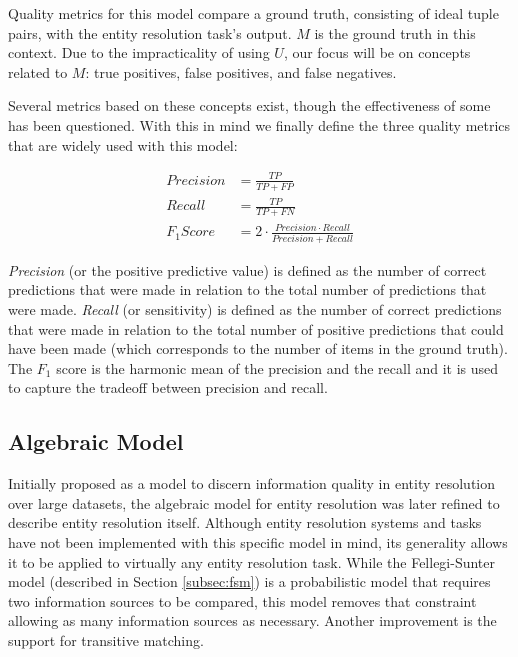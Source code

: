 \documentclass[11pt]{article}
\begin{document}
    Quality metrics for this model compare a ground truth, consisting of ideal
    tuple pairs, with the entity resolution task's output.
    $M$ is the ground truth in this context.
    Due to the impracticality of using $U$, our focus will be on concepts
    related to $M$: true positives, false positives, and false negatives.
    
    Several metrics based on these concepts exist, though the effectiveness of
    some has been questioned\cite{Goga2015}.
    With this in mind we finally define the three quality metrics that are
    widely used with this model:

    \begin{align}
    Precision&=\frac{TP}{TP+FP} \\
    Recall&=\frac{TP}{TP+FN} \\
    F_1 Score&=2 \cdot \frac{Precision \cdot Recall}{Precision+Recall}
    \end{align}

    \textit{Precision} (or the positive predictive value) is defined as the
    number of correct predictions that were made in relation to the total number
    of predictions that were made.
    \textit{Recall} (or sensitivity) is defined as the number of correct
    predictions that were made in relation to the total number of positive
    predictions that could have been made (which corresponds to the number of
    items in the ground truth).
    The \textit{$F_1$} score is the harmonic mean of the precision and the
    recall and it is used to capture the tradeoff between precision and
    recall\cite{hitesh2012}.

    \subsection[algebraic]{Algebraic Model}\label{subsec:algebraic}

    Initially proposed as a model to discern information quality in entity
    resolution over large datasets\cite{tal2007algebraic}, the algebraic model
    for entity resolution was later refined to describe entity resolution
    itself\cite{Tal11}.
    Although entity resolution systems and tasks have not been implemented with
    this specific model in mind, its generality allows it to be applied to
    virtually any entity resolution task.
    While the Fellegi-Sunter model (described in Section \ref{subsec:fsm}) is a probabilistic model 
    that requires two information sources to be compared, this model removes
    that constraint allowing as many information sources as necessary.
    Another improvement is the support for transitive matching.
    
\end{document}
